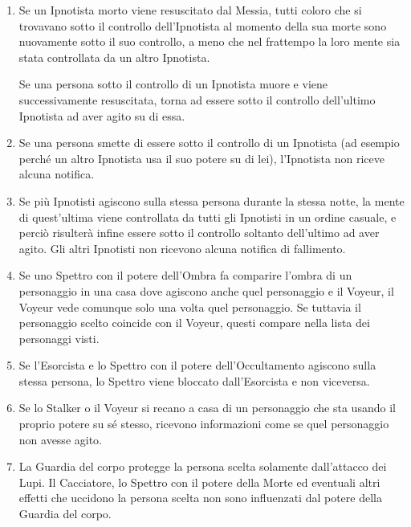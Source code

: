 \documentclass[a4paper,10pt]{article}
\begin{document}
\begin{enumerate}
 \item Se un Ipnotista morto viene resuscitato dal Messia, tutti coloro che si trovavano sotto il controllo dell'Ipnotista al momento della sua morte sono nuovamente sotto il suo controllo, a meno che nel frattempo la loro mente sia stata controllata da un altro Ipnotista.
 
 Se una persona sotto il controllo di un Ipnotista muore e viene successivamente resuscitata, torna ad essere sotto il controllo dell'ultimo Ipnotista ad aver agito su di essa.
 
 \item Se una persona smette di essere sotto il controllo di un Ipnotista (ad esempio perché un altro Ipnotista usa il suo potere su di lei), l'Ipnotista non riceve alcuna notifica.
 
 \item Se più Ipnotisti agiscono sulla stessa persona durante la stessa notte, la mente di quest'ultima viene controllata da tutti gli Ipnotisti in un ordine casuale, e perciò risulterà infine essere sotto il controllo soltanto dell'ultimo ad aver agito. Gli altri Ipnotisti non ricevono alcuna notifica di fallimento.
 
 \item Se uno Spettro con il potere dell'Ombra fa comparire l'ombra di un personaggio in una casa dove agiscono anche quel personaggio e il Voyeur, il Voyeur vede comunque solo una volta quel personaggio. Se tuttavia il personaggio scelto coincide con il Voyeur, questi compare nella lista dei personaggi visti.

 \item Se l'Esorcista e lo Spettro con il potere dell'Occultamento agiscono sulla stessa persona, lo Spettro viene bloccato dall'Esorcista e non viceversa.
 
 \item Se lo Stalker o il Voyeur si recano a casa di un personaggio che sta usando il proprio potere su sé stesso, ricevono informazioni come se quel personaggio non avesse agito.
 
 \item La Guardia del corpo protegge la persona scelta solamente dall'attacco dei Lupi. Il Cacciatore, lo Spettro con il potere della Morte ed eventuali altri effetti che uccidono la persona scelta non sono influenzati dal potere della Guardia del corpo.
 

\end{enumerate}
\end{document}
